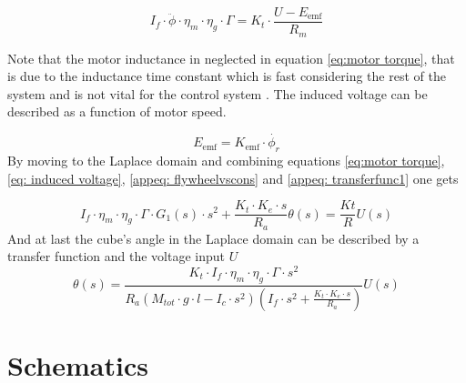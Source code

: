 \documentclass[a4paper,11pt]{kth-mag}
\begin{document}
\begin{equation} \label{eq:motor torque}
I_f \cdot \ddot{\phi} \cdot \eta_m \cdot \eta_g \cdot \Gamma = K_t \cdot \frac{U-E_{\text{emf}} }{R_m}
\end{equation}

Note that the motor inductance in neglected in equation \eqref{eq:motor torque}, that is due to the inductance time constant which is fast considering the rest of the system and is not vital for the control system \cite{KTHpendulum}.
The induced voltage can be described as a function of motor speed.

\begin{equation} \label{eq: induced voltage}
E_{\text{emf}} = K_{\text{emf}} \cdot \dot{\phi_r}
\end{equation}
By moving to the Laplace domain and combining equations \ref{eq:motor torque}, \ref{eq: induced voltage}, \ref{appeq: flywheelvscons} and \ref{appeq: transferfunc1} one gets

\begin{equation}
I_f \cdot \eta_m \cdot \eta_g \cdot \Gamma \cdot G_1(s) \cdot s^2 + \frac{K_t \cdot K_e \cdot s}{R_a} \theta(s) = \frac{Kt}{R} U(s)
\end{equation}
And at last the cube's angle in the Laplace domain can be described by a transfer function and the voltage input $U$
\begin{equation}
\theta(s) = \frac{K_t \cdot I_f \cdot \eta_m \cdot \eta_g \cdot \Gamma \cdot s^2}{R_a (M_{tot} \cdot g \cdot l - I_c \cdot s^2)(I_f \cdot s^2 + \frac{K_t \cdot K_e \cdot s}{R_a})} U(s)
\end{equation}

\chapter{Schematics} \label{appC}
\end{document}
